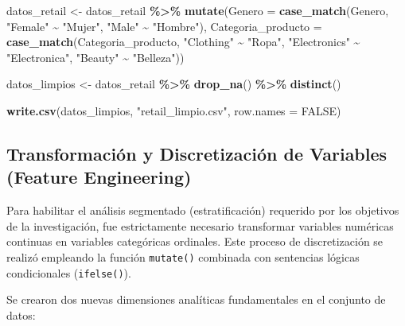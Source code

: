 \documentclass[oneside,11pt]{Latex/Classes/PhDthesisPSnPDF}
\newenvironment{Shaded}{\begin{snugshade}}{\end{snugshade}}
\newcommand{\AttributeTok}[1]{\textcolor[rgb]{0.13,0.29,0.53}{#1}}
\newcommand{\ConstantTok}[1]{\textcolor[rgb]{0.56,0.35,0.01}{#1}}
\newcommand{\FunctionTok}[1]{\textcolor[rgb]{0.13,0.29,0.53}{\textbf{#1}}}
\newcommand{\NormalTok}[1]{#1}
\newcommand{\OtherTok}[1]{\textcolor[rgb]{0.56,0.35,0.01}{#1}}
\newcommand{\SpecialCharTok}[1]{\textcolor[rgb]{0.81,0.36,0.00}{\textbf{#1}}}
\newcommand{\StringTok}[1]{\textcolor[rgb]{0.31,0.60,0.02}{#1}}
\begin{document}
\begin{Shaded}
\begin{Highlighting}[]
\NormalTok{datos\_retail }\OtherTok{\textless{}{-}}\NormalTok{ datos\_retail }\SpecialCharTok{\%\textgreater{}\%}
  \FunctionTok{mutate}\NormalTok{(}\AttributeTok{Genero =} \FunctionTok{case\_match}\NormalTok{(Genero,}
                           \StringTok{"Female"} \SpecialCharTok{\textasciitilde{}} \StringTok{"Mujer"}\NormalTok{,}
                         \StringTok{"Male"} \SpecialCharTok{\textasciitilde{}} \StringTok{"Hombre"}\NormalTok{),}
         \AttributeTok{Categoria\_producto =} \FunctionTok{case\_match}\NormalTok{(Categoria\_producto,}
                                         \StringTok{"Clothing"} \SpecialCharTok{\textasciitilde{}} \StringTok{"Ropa"}\NormalTok{,}
                                         \StringTok{"Electronics"} \SpecialCharTok{\textasciitilde{}} \StringTok{"Electronica"}\NormalTok{,}
                                         \StringTok{"Beauty"} \SpecialCharTok{\textasciitilde{}} \StringTok{"Belleza"}\NormalTok{))}

\NormalTok{datos\_limpios }\OtherTok{\textless{}{-}}\NormalTok{ datos\_retail }\SpecialCharTok{\%\textgreater{}\%}
  \FunctionTok{drop\_na}\NormalTok{() }\SpecialCharTok{\%\textgreater{}\%}
  \FunctionTok{distinct}\NormalTok{()}

\FunctionTok{write.csv}\NormalTok{(datos\_limpios, }\StringTok{"retail\_limpio.csv"}\NormalTok{, }\AttributeTok{row.names =} \ConstantTok{FALSE}\NormalTok{)}
\end{Highlighting}
\end{Shaded}

\subsection{Transformación y Discretización de Variables (Feature Engineering)}

Para habilitar el análisis segmentado (estratificación) requerido por
los objetivos de la investigación, fue estrictamente necesario
transformar variables numéricas continuas en variables categóricas
ordinales. Este proceso de discretización se realizó empleando la
función \texttt{mutate()} combinada con sentencias lógicas condicionales
(\texttt{ifelse()}).

Se crearon dos nuevas dimensiones analíticas fundamentales en el
conjunto de datos:
\end{document}
